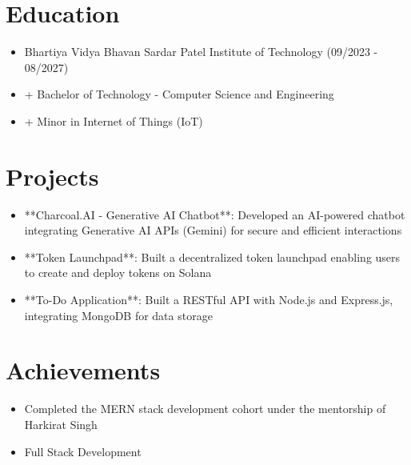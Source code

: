 \documentclass[10pt]{article}
\begin{document}
\section*{Education}
\begin{itemize}[leftmargin=*]

  \item Bhartiya Vidya Bhavan Sardar Patel Institute of Technology (09/2023 - 08/2027)

  \item + Bachelor of Technology - Computer Science and Engineering

  \item + Minor in Internet of Things (IoT)

\end{itemize}



\section*{Projects}
\begin{itemize}[leftmargin=*]

  \item **Charcoal.AI - Generative AI Chatbot**: Developed an AI-powered chatbot integrating Generative AI APIs (Gemini) for secure and efficient interactions

  \item **Token Launchpad**: Built a decentralized token launchpad enabling users to create and deploy tokens on Solana

  \item **To-Do Application**: Built a RESTful API with Node.js and Express.js, integrating MongoDB for data storage

\end{itemize}





\section*{Achievements}
\begin{itemize}[leftmargin=*]

  \item Completed the MERN stack development cohort under the mentorship of Harkirat Singh

  \item Full Stack Development

\end{itemize}
\end{document}
